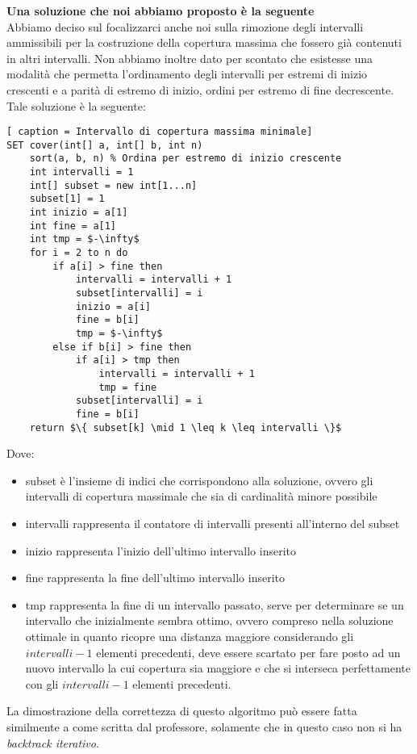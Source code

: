 \documentclass[../cheatSheetAlgoritmi.tex]{subfiles}
\begin{document}
\textbf{Una soluzione che noi abbiamo proposto è la seguente} \\
Abbiamo deciso sul focalizzarci anche noi sulla rimozione degli intervalli ammissibili per la costruzione della copertura massima che fossero già contenuti in altri intervalli. Non abbiamo inoltre dato per scontato che esistesse una modalità che permetta l'ordinamento degli intervalli per estremi di inizio crescenti e a parità di estremo di inizio, ordini per estremo di fine decrescente. \\
Tale soluzione è la seguente:
\begin{lstlisting}[ caption = Intervallo di copertura massima minimale]
SET cover(int[] a, int[] b, int n)
	sort(a, b, n) % Ordina per estremo di inizio crescente
	int intervalli = 1
	int[] subset = new int[1...n]
	subset[1] = 1
	int inizio = a[1]
	int fine = a[1]
	int tmp = $-\infty$
	for i = 2 to n do
		if a[i] > fine then
			intervalli = intervalli + 1
			subset[intervalli] = i
			inizio = a[i]
			fine = b[i]
			tmp = $-\infty$
		else if b[i] > fine then
			if a[i] > tmp then
				intervalli = intervalli + 1
				tmp = fine
			subset[intervalli] = i
			fine = b[i]
	return $\{ subset[k] \mid 1 \leq k \leq intervalli \}$ 
\end{lstlisting}
Dove:
\begin{itemize}
	\item subset è l'insieme di indici che corrispondono alla soluzione, ovvero gli intervalli di copertura massimale che sia di cardinalità minore possibile
	\item intervalli rappresenta il contatore di intervalli presenti all'interno del subset
	\item inizio rappresenta l'inizio dell'ultimo intervallo inserito
	\item fine rappresenta la fine dell'ultimo intervallo inserito
	\item tmp rappresenta la fine di un intervallo passato, serve per determinare se un intervallo che inizialmente sembra ottimo, ovvero compreso nella soluzione ottimale in quanto ricopre una distanza maggiore considerando gli $intervalli - 1$ elementi precedenti, deve essere scartato per fare posto ad un nuovo intervallo la cui copertura sia maggiore e che si interseca perfettamente con gli $intervalli - 1$ elementi precedenti.
\end{itemize}
La dimostrazione della correttezza di questo algoritmo può essere fatta similmente a come scritta dal professore, solamente che in questo caso non si ha \emph{backtrack iterativo}.\\\\
\end{document}
